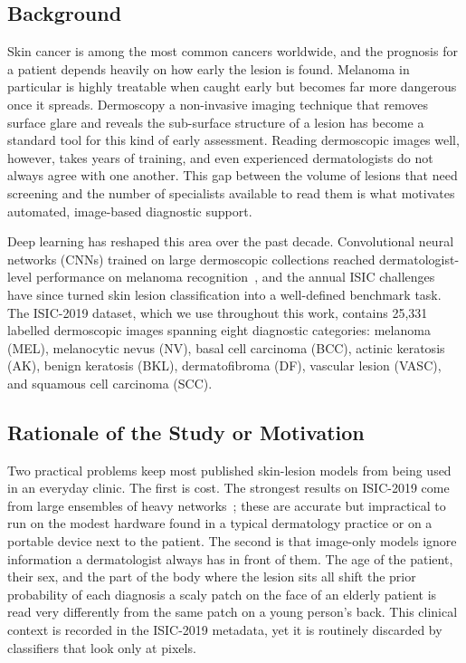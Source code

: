 \subsection{Background}

Skin cancer is among the most common cancers worldwide, and the prognosis for a
patient depends heavily on how early the lesion is found. Melanoma in
particular is highly treatable when caught early but becomes far more dangerous
once it spreads. Dermoscopy a non-invasive imaging technique that removes
surface glare and reveals the sub-surface structure of a lesion has become a
standard tool for this kind of early assessment. Reading dermoscopic images
well, however, takes years of training, and even experienced dermatologists do
not always agree with one another. This gap between the volume of lesions that
need screening and the number of specialists available to read them is what
motivates automated, image-based diagnostic support.

Deep learning has reshaped this area over the past decade. Convolutional neural
networks (CNNs) trained on large dermoscopic collections reached
dermatologist-level performance on melanoma recognition~\cite{esteva2017dermatologist},
and the annual ISIC challenges have since turned skin lesion classification into
a well-defined benchmark task. The ISIC-2019 dataset, which we use throughout
this work, contains 25{,}331 labelled dermoscopic images spanning eight
diagnostic categories: melanoma (MEL), melanocytic nevus (NV), basal cell
carcinoma (BCC), actinic keratosis (AK), benign keratosis (BKL),
dermatofibroma (DF), vascular lesion (VASC), and squamous cell carcinoma (SCC).

\subsection{Rationale of the Study or Motivation}

Two practical problems keep most published skin-lesion models from being used in
an everyday clinic. The first is cost. The strongest results on ISIC-2019 come
from large ensembles of heavy networks~\cite{isic2019leaderboard,gessert2020ensembles};
these are accurate but impractical to run on the modest hardware found in a
typical dermatology practice or on a portable device next to the patient. The
second is that image-only models ignore information a dermatologist always has
in front of them. The age of the patient, their sex, and the part of the body
where the lesion sits all shift the prior probability of each diagnosis a
scaly patch on the face of an elderly patient is read very differently from the
same patch on a young person's back. This clinical context is recorded in the
ISIC-2019 metadata, yet it is routinely discarded by classifiers that look only
at pixels.


